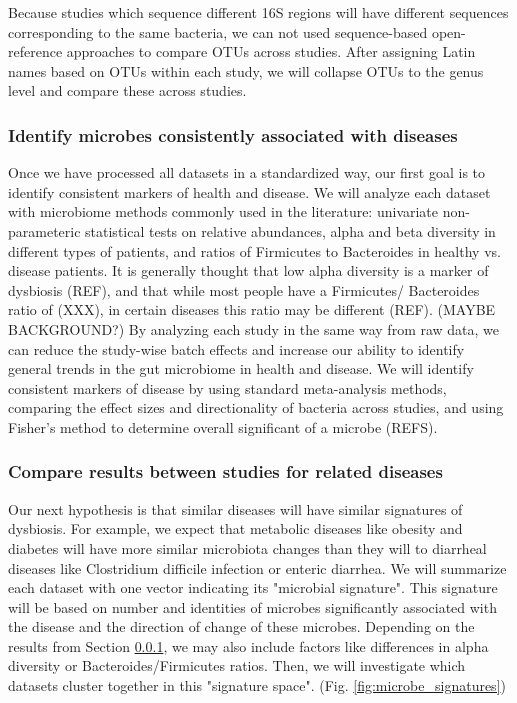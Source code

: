 \documentclass[12pt]{article}
\begin{document}
Because studies which sequence different 16S regions will have 
different sequences corresponding to the same bacteria, we can not 
used sequence-based open-reference approaches to compare OTUs across 
studies. After assigning Latin names based on OTUs within each study, 
we will collapse OTUs to the genus level and compare these across 
studies.

\subsubsection{Identify microbes consistently associated with diseases}\label{sec:indep_studies}
Once we have processed all datasets in a standardized way, our first 
goal is to identify consistent markers of health and disease. We will 
analyze each dataset with microbiome methods commonly used in the 
literature: univariate non-parameteric statistical tests on relative 
abundances, alpha and beta diversity in different types of patients, 
and ratios of Firmicutes to Bacteroides in healthy vs. disease 
patients. It is generally thought that low alpha diversity is a marker 
of dysbiosis (REF), and that while most people have a Firmicutes/
Bacteroides ratio of (XXX), in certain diseases this ratio may be 
different (REF). (MAYBE BACKGROUND?) By analyzing each study in the 
same way from raw data, we can reduce the study-wise batch effects and 
increase our ability to identify general trends in the gut microbiome 
in health and disease. We will identify consistent markers of disease 
by using standard meta-analysis methods, comparing the effect sizes 
and directionality of bacteria across studies, and using Fisher's 
method to determine overall significant of a microbe (REFS). 

\subsubsection{Compare results between studies for related diseases}\label{sec:signatures}
Our next hypothesis is that similar diseases will have similar 
signatures of dysbiosis. For example, we expect that metabolic 
diseases like obesity and diabetes will have more similar microbiota 
changes than they will to diarrheal diseases like Clostridium 
difficile infection or enteric diarrhea. We will summarize each 
dataset with one vector indicating its "microbial signature". This 
signature will be based on number and identities of microbes 
significantly associated with the disease and the direction of change 
of these microbes. Depending on the results from Section 
\ref{sec:indep_studies}, we may also include factors like differences 
in alpha diversity or Bacteroides/Firmicutes ratios. Then, we will 
investigate which datasets cluster together in this "signature space". 
(Fig. \ref{fig:microbe_signatures})
\end{document}
